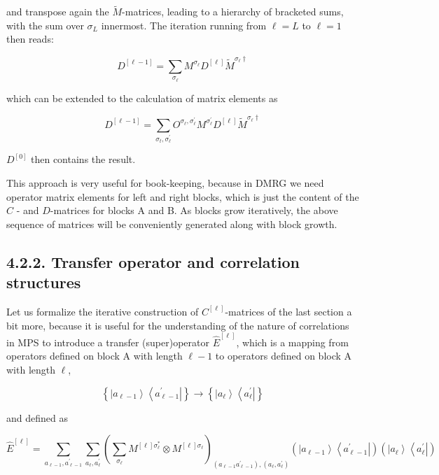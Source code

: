 \documentclass[12pt]{article}
\begin{document}
and transpose again the $\tilde{M}$-matrices, leading to a hierarchy of bracketed sums, with the sum over $\sigma_{L}$ innermost. The iteration running from $\ell=L$ to $\ell=1$ then reads:


\begin{equation*}
D^{[\ell-1]}=\sum_{\sigma_{\ell}} M^{\sigma_{\ell}} D^{[\ell]} \tilde{M}^{\sigma_{\ell} \dagger} \tag{102}
\end{equation*}


which can be extended to the calculation of matrix elements as


\begin{equation*}
D^{[\ell-1]}=\sum_{\sigma_{t}, \sigma_{\ell}^{\prime}} O^{\sigma_{\ell}, \sigma_{\ell}^{\prime}} M^{\sigma_{\ell}^{\prime}} D^{[\ell]} \tilde{M}^{\sigma_{\ell} \dagger} \tag{103}
\end{equation*}


$D^{[0]}$ then contains the result.

This approach is very useful for book-keeping, because in DMRG we need operator matrix elements for left and right blocks, which is just the content of the $C$ - and $D$-matrices for blocks A and B. As blocks grow iteratively, the above sequence of matrices will be conveniently generated along with block growth.

\subsection*{4.2.2. Transfer operator and correlation structures}
Let us formalize the iterative construction of $C^{[\ell]}$-matrices of the last section a bit more, because it is useful for the understanding of the nature of correlations in MPS to introduce a transfer (super)operator $\hat{E}^{[\ell]}$, which is a mapping from operators defined on block A with length $\ell-1$ to operators defined on block A with length $\ell$,


\begin{equation*}
\left\{\left|a_{\ell-1}\right\rangle\left\langle a_{\ell-1}^{\prime}\right|\right\} \rightarrow\left\{\left|a_{\ell}\right\rangle\left\langle a_{\ell}^{\prime}\right|\right\} \tag{104}
\end{equation*}


and defined as


\begin{equation*}
\hat{E}^{[\ell]}=\sum_{a_{\ell-1}, a_{\ell-1}^{\prime}} \sum_{a_{\ell}, a_{\ell}^{\prime}}\left(\sum_{\sigma_{\ell}} M^{[\ell] \sigma_{\ell}^{*}} \otimes M^{[\ell] \sigma_{\ell}}\right)_{\left(a_{\ell-1} a_{\ell-1}^{\prime}\right),\left(a_{\ell}, a_{\ell}^{\prime}\right)}\left(\left|a_{\ell-1}\right\rangle\left\langle a_{\ell-1}^{\prime}\right|\right)\left(\left|a_{\ell}\right\rangle\left\langle a_{\ell}^{\prime}\right|\right) \tag{105}
\end{equation*}
\end{document}
